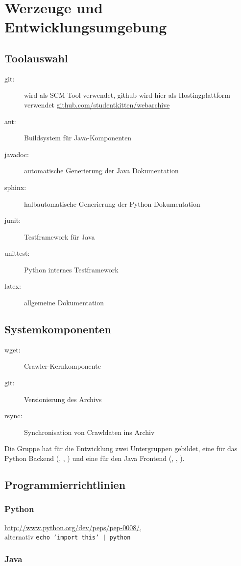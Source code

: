 \chapter{Werzeuge und Entwicklungsumgebung}
\label{cha:werzeuge_und_entwicklungsumgebung}

\section{Toolauswahl} 
\label{sec:toolauswahl}

\begin{description}
    \item [git:] wird als SCM Tool verwendet, github wird hier als 
        Hostingplattform verwendet \url{github.com/studentkitten/webarchive}
    \item [ant:] Buildsystem für Java-Komponenten
    \item [javadoc:] automatische Generierung der Java Dokumentation
    \item [sphinx:] halbautomatische Generierung der Python Dokumentation
    \item [junit:] Testframework für Java
    \item [unittest:] Python internes Testframework 
    \item [latex:] allgemeine Dokumentation
    
\end{description}


\section{Systemkomponenten} 
\label{sec:systemkomponenten}
\begin{description}
    \item [wget:] Crawler-Kernkomponente
    \item [git:] Versionierung des Archivs
    \item [rsync:] Synchronisation von Crawldaten ins Archiv
\end{description}


Die Gruppe hat für die Entwicklung zwei Untergruppen gebildet, 
eine für das Python Backend (\ciii, \flo, \ci) und eine für den Java Frontend
(\cii, \sab, \eddy).

\section{Programmierrichtlinien} 
\label{sec:guidelines}
\subsection{Python} 
	\url{http://www.python.org/dev/peps/pep-0008/}, \\alternativ \texttt{echo 'import this' | python}
\subsection{Java}
	



